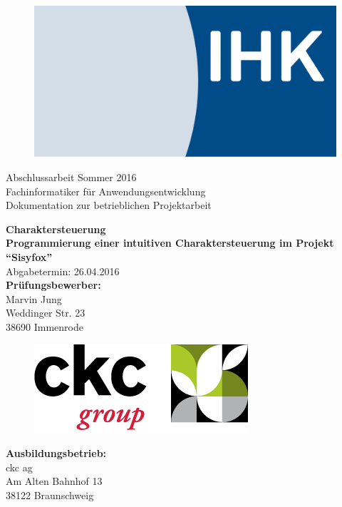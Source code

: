 \begin{titlepage}
\begin{center}
\begin{figure}
\centering
\includegraphics[scale=0.05]{Bilder/ihk_logo.png}
\end{figure}
\large
Abschlussarbeit Sommer 2016\\
\vspace{12pt}
Fachinformatiker für Anwendungsentwicklung\\
\vspace{4pt}
\Large
Dokumentation zur betrieblichen Projektarbeit\\
\vspace{70pt}

\textbf{\huge
Charaktersteuerung\\
\vspace{15pt}
\Large
Programmierung einer intuitiven Charaktersteuerung im Projekt "`Sisyfox"'\\
}
\vspace{22pt}
\small
Abgabetermin: 26.04.2016\\
\vspace{28pt}
\normalsize
\textbf{Prüfungsbewerber:\\}
Marvin Jung\\
Weddinger Str. 23\\
38690 Immenrode\\
\vspace{30pt}
\begin{figure}[ht]
\centering
\includegraphics[scale=0.6]{Bilder/ckc_logo.png}
\end{figure}
\textbf{Ausbildungsbetrieb:\\}
ckc ag\\
Am Alten Bahnhof 13\\
38122 Braunschweig\\

\end{center}
\end{titlepage}

\newpage{}